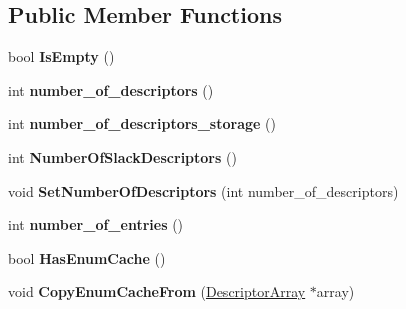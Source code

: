 \subsection*{Public Member Functions}
\begin{DoxyCompactItemize}
\item 
bool {\bfseries Is\+Empty} ()\hypertarget{classv8_1_1internal_1_1_descriptor_array_a93a755f37dc42fc8f2f8938680d16966}{}\label{classv8_1_1internal_1_1_descriptor_array_a93a755f37dc42fc8f2f8938680d16966}

\item 
int {\bfseries number\+\_\+of\+\_\+descriptors} ()\hypertarget{classv8_1_1internal_1_1_descriptor_array_af3ee66fb355520b97356bf38834c7ce3}{}\label{classv8_1_1internal_1_1_descriptor_array_af3ee66fb355520b97356bf38834c7ce3}

\item 
int {\bfseries number\+\_\+of\+\_\+descriptors\+\_\+storage} ()\hypertarget{classv8_1_1internal_1_1_descriptor_array_aa6e4fbd791916a444b31516bbc92b4b1}{}\label{classv8_1_1internal_1_1_descriptor_array_aa6e4fbd791916a444b31516bbc92b4b1}

\item 
int {\bfseries Number\+Of\+Slack\+Descriptors} ()\hypertarget{classv8_1_1internal_1_1_descriptor_array_adbef2e580eec6a97c9b1ac293f33cc6b}{}\label{classv8_1_1internal_1_1_descriptor_array_adbef2e580eec6a97c9b1ac293f33cc6b}

\item 
void {\bfseries Set\+Number\+Of\+Descriptors} (int number\+\_\+of\+\_\+descriptors)\hypertarget{classv8_1_1internal_1_1_descriptor_array_a81fde9ba08db81204710253378cf7966}{}\label{classv8_1_1internal_1_1_descriptor_array_a81fde9ba08db81204710253378cf7966}

\item 
int {\bfseries number\+\_\+of\+\_\+entries} ()\hypertarget{classv8_1_1internal_1_1_descriptor_array_a5199aeed899ac434631be78f47c1788d}{}\label{classv8_1_1internal_1_1_descriptor_array_a5199aeed899ac434631be78f47c1788d}

\item 
bool {\bfseries Has\+Enum\+Cache} ()\hypertarget{classv8_1_1internal_1_1_descriptor_array_a84574d4917be57101999d94f040c0d57}{}\label{classv8_1_1internal_1_1_descriptor_array_a84574d4917be57101999d94f040c0d57}

\item 
void {\bfseries Copy\+Enum\+Cache\+From} (\hyperlink{classv8_1_1internal_1_1_descriptor_array}{Descriptor\+Array} $\ast$array)\hypertarget{classv8_1_1internal_1_1_descriptor_array_a09154797491f69013d2318dd2ef5d1fc}{}\label{classv8_1_1internal_1_1_descriptor_array_a09154797491f69013d2318dd2ef5d1fc}


\end{DoxyCompactItemize}
